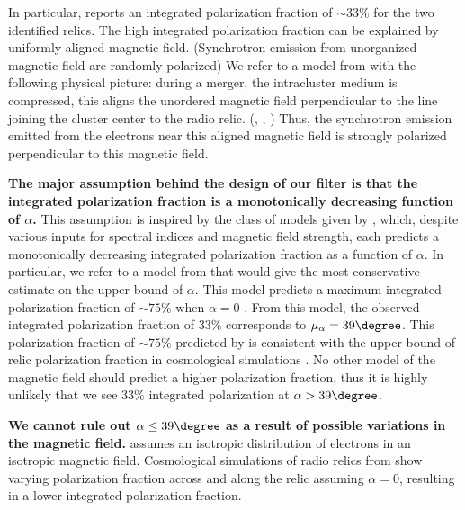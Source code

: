 In particular, \cite{L13} reports an integrated
polarization fraction of $\sim33\%$ for the two identified relics. The
high integrated polarization fraction can be explained by uniformly aligned
magnetic field. (Synchrotron emission from unorganized magnetic field are
randomly polarized) We refer to a model from \citet{E98} with
the following physical picture: during a merger, the intracluster medium is compressed, this aligns the unordered
magnetic field perpendicular to the line joining the cluster center to the
radio relic. (\citealt{E98}, \citealt{vanWeeren10}, \citealt{Feretti12})
Thus, the synchrotron emission emitted from the electrons near this aligned
magnetic field is strongly polarized perpendicular to this magnetic field. \par
\textbf{The major assumption behind the design of our filter
is that the integrated polarization fraction is a monotonically
decreasing function of $\alpha$.} 
This assumption is inspired by the class of models given by \cite{E98}, 
which, despite various inputs for spectral indices and magnetic field strength, each predicts a monotonically decreasing integrated
polarization fraction as a function of $\alpha$. 
In particular, we refer to a model from \cite{E98} that would give the most
conservative estimate on the upper bound of $\alpha$. 
This model predicts a maximum integrated polarization fraction of
$\sim75\%$ when $\alpha = 0$ . From this model, the observed integrated
polarization fraction of 33\% corresponds to $\mu_\alpha =  39\degree$. 
This  polarization fraction of $\sim 75\%$ predicted by \citep{E98} is
consistent with the upper bound of relic polarization fraction in cosmological
simulations \citep{S13}. No other model of the magnetic field should predict a higher polarization fraction, thus it is highly unlikely that we see 33\%
integrated polarization at $\alpha > 39\degree$. \par 
\textbf{We cannot rule out $\alpha \leq 39\degree$ as a result of possible
variations in the magnetic field.} \cite{E98} assumes an isotropic
distribution of electrons in an isotropic magnetic field. Cosmological
simulations of radio relics from \cite{S13} show varying polarization
fraction across and along the relic assuming $\alpha = 0$, resulting in a
lower integrated polarization fraction. 
